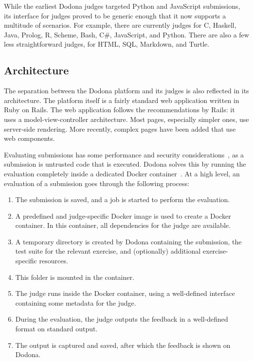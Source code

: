 \documentclass[../main]{subfiles}
\begin{document}
While the earliest Dodona judges targeted Python and JavaScript submissions, its interface for judges proved to be generic enough that it now supports a multitude of scenarios.
For example, there are currently judges for C, Haskell, Java, Prolog, R, Scheme, Bash, C\#, JavaScript, and Python.
There are also a few less straightforward judges, for HTML, SQL, Markdown, and Turtle.

\subsection{Architecture}\label{subsec:architecture}

The separation between the Dodona platform and its judges is also reflected in its architecture.
The platform itself is a fairly standard web application written in Ruby on Rails.
The web application follows the recommendations by Rails: it uses a model-view-controller architecture.
Most pages, especially simpler ones, use server-side rendering.
More recently, complex pages have been added that use web components.

Evaluating submissions has some performance and security considerations~\autocite{wasikSurveyOnlineJudge2018}, as a submission is untrusted code that is executed.
Dodona solves this by running the evaluation completely inside a dedicated Docker container~\autocite{pevelerComparingJailedSandboxes2019}.
At a high level, an evaluation of a submission goes through the following process:
\begin{enumerate}[noitemsep]
    \item The submission is saved, and a job is started to perform the evaluation.
    \item A predefined and judge-specific Docker image is used to create a Docker container.
          In this container, all dependencies for the judge are available.
    \item A temporary directory is created by Dodona containing the submission, the test suite for the relevant exercise, and (optionally) additional exercise-specific resources.
    \item This folder is mounted in the container.
    \item The judge runs inside the Docker container, using a well-defined interface containing some metadata for the judge.
    \item During the evaluation, the judge outputs the feedback in a well-defined format on standard output.
    \item The output is captured and saved, after which the feedback is shown on Dodona.
\end{enumerate}
\end{document}
